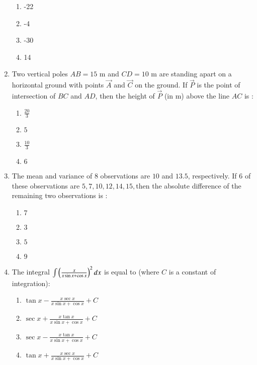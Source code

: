 \documentclass[journal]{IEEEtran}
\begin{document}
\begin{enumerate}
\begin{enumerate}
    \item -22
    \item -4
    \item -30
    \item 14
\end{enumerate}
\item Two vertical poles $ AB = 15 $ m and $CD = 10$ m
are standing apart on a horizontal ground with
points $\vec{A}$ and $\vec{C}$ on the ground. If $\vec{P}$ is the point
of intersection of $BC$ and $AD$, then the height
of $\vec{P}$ (in m) above the line $AC$ is :
\begin{enumerate}
\item  $\frac{20}{3}$
\item  $ 5 $
\item  $ \frac{10}{3}$
\item  $ 6 $
\end{enumerate}
\item The mean and variance of 8 observations are $10$ and $13.5$, respectively. If 6 of these observations are $5, 7, 10, 12, 14, 15, $then the absolute difference of the remaining two observations is :
\begin{enumerate}
\item $7$
\item $3$
\item $5$ 
\item $9$
\end{enumerate}
\item The integral $\int\left(\frac{x}{x\sin x+\cos x}\right)^2 dx$ is equal to (where $C$ is a constant of integration):
\begin{enumerate}
    \item $\tan x-\frac{x\sec x}{x\sin x+\cos x}+C$
    \item $\sec x+\frac{x\tan x}{x\sin x+\cos x}+C$
    \item $\sec x-\frac{x\tan x}{x\sin x+\cos x}+C$
    \item $\tan x+\frac{x\sec x}{x \sin x + \cos x}+C$
\end{enumerate}

\end{enumerate}
\end{document}
